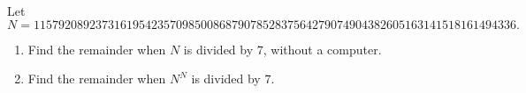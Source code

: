 Let
\[N=115792089237316195423570985008687907852837564279074904382605163141518161494336.\]
\begin{enumerate}
\item[(a)] Find the remainder when $N$ is divided by $7$, without a computer.
\item[(b)] Find the remainder when $N^N$ is divided by $7$.
\end{enumerate}
